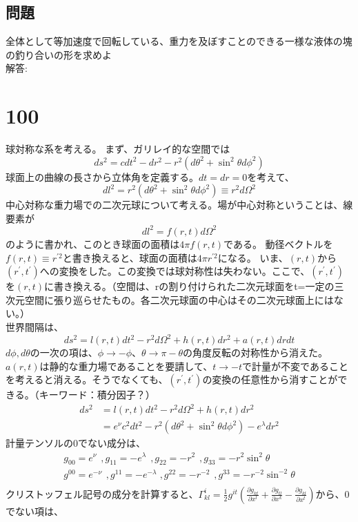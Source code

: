 \documentclass{jsarticle}
\newcommand{\pder}[2][]{\frac{\partial#1}{\partial#2}}
\newcommand{\pderx}[2][]{\pder[#1]{x^{#2}}}
\newcommand{\pdergx}[2][]{\pderx[g_{#1}]{#2}}
\newcommand{\half}{\frac{1}{2}}
\newcommand{\hfpt}{\hspace{5pt}}
\newcommand{\beq}{\begin{equation}}
\newcommand{\eeq}{\end{equation}}
\begin{document}
\subsection{問題}
全体として等加速度で回転している、重力を及ぼすことのできる一様な液体の塊の釣り合いの形を求めよ\\
解答:\\
\section{100}
球対称な系を考える。
まず、ガリレイ的な空間では
\beq
ds^2 = cdt^2 - dr^2 - r^2(d\theta^2 + \sin^2\theta d\phi^2)
\eeq
球面上の曲線の長さから立体角を定義する。$dt = dr = 0$を考えて、
\beq
    dl^2 = r^2 (d\theta^2 + \sin^2\theta d\phi^2) \equiv r^2 d\Omega^2
\eeq
中心対称な重力場での二次元球について考える。場が中心対称ということは、線要素が
\beq
    dl^2 = f(r, t)d\Omega^2
\eeq
のように書かれ、このとき球面の面積は$4\pi f(r,t)$である。
動径ベクトルを$f(r, t) \equiv r^{\prime 2}$と書き換えると、球面の面積は$4\pi r^{\prime 2}$になる。
いま、$(r,t)$から$(r^\prime , t^\prime)$への変換をした。この変換では球対称性は失わない。ここで、$(r^\prime, t^\prime)$を$(r,t)$に書き換える。（空間は、rの割り付けられた二次元球面をt=一定の三次元空間に張り巡らせたもの。各二次元球面の中心はその二次元球面上にはない。）\\
世界間隔は、
\beq
ds^2 = l(r, t) dt^ 2 -r^2 d\Omega^2 + h(r, t) dr^2 + a(r, t) dr dt
\eeq
$d\phi, d\theta$の一次の項は、$\phi \rightarrow -\phi$、$\theta \rightarrow \pi - \theta$の角度反転の対称性から消えた。
$a(r, t)$は静的な重力場であることを要請して、$t \rightarrow -t$で計量が不変であることを考えると消える。そうでなくても、$(r^\prime, t^\prime)$の変換の任意性から消すことができる。（キーワード：積分因子？）
\begin{align}
    ds^2 &= l(r, t) dt^ 2 -r^2 d\Omega^2 + h(r, t) dr^2\\
         &= e^\nu c^2 dt^ 2 -r^2 (d\theta^2 + \sin^2\theta d\phi^2) - e^\lambda dr^2
\end{align}
計量テンソルの$0$でない成分は、
\begin{align}
    g_{00} = e^\nu \hfpt , g_{11} = -e^\lambda\hfpt ,g_{22} = -r^2\hfpt ,g_{33} = -r^2 \sin^2\theta\\
    g^{00} = e^{-\nu} \hfpt , g^{11} = -e^{-\lambda\hfpt} ,g^{22} = -r^{-2}\hfpt ,g^{33} = -r^{-2} \sin^{-2}\theta\\
\end{align}
クリストッフェル記号の成分を計算すると、$\Gamma^i_{kl}=\half g^{it}(\pdergx[kt]{l} + \pdergx[tl]{k} - \pdergx[kl]{t})$から、$0$でない項は、
\end{document}
